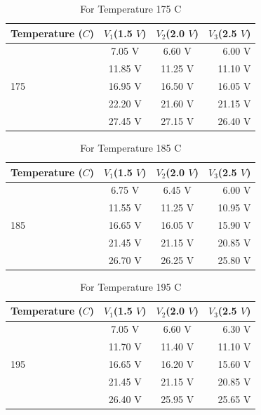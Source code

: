 \documentclass[aps,twocolumn,secnumarabic,nobalancelastpage,amsmath,amssymb,
nofootinbib]{revtex4}
\begin{document}
\begin{center}
\begin{table}[htbp]
\begin{tabular}{|l|c|c|r|}
\hline
{\small Temperature ($C$)} & {\small $V_1$(1.5 $V$)} & {\small $V_2$(2.0 $V$)} & {\small $V_3$(2.5 $V$)} \\
\hline
		& 7.05 V 		& 6.60 V& 	6.00 V \\
 		& 11.85 V		& 11.25 V & 11.10 V \\
175 	& 16.95 V 		& 16.50 V & 16.05 V \\
		& 22.20 V 		& 21.60 V & 21.15 V \\
 		& 27.45 V 		& 27.15 V & 26.40 V \\

\hline
\end{tabular}
\caption{\label{tab:linfitresults} For Temperature  175 C}
\end{table}
\end{center}

\begin{center}
\begin{table}[htbp]
\begin{tabular}{|l|c|c|r|}
\hline
{\small Temperature ($C$)} & {\small $V_1$(1.5 $V$)} & {\small $V_2$(2.0 $V$)} & {\small $V_3$(2.5 $V$)} \\
\hline
		& 6.75 V 		& 6.45 V& 	6.00 V \\
 		& 11.55 V		& 11.25 V & 10.95 V \\
185 	& 16.65 V 		& 16.05 V & 15.90 V \\
 		& 21.45 V 		& 21.15 V & 20.85 V \\
 		& 26.70 V 		& 26.25 V & 25.80 V \\

\hline
\end{tabular}
\caption{\label{tab:linfitresults} For Temperature 185 C }
\end{table}
\end{center}

\begin{center}
\begin{table}[htbp]
\begin{tabular}{|l|c|c|r|}
\hline
{\small Temperature ($C$)} & {\small $V_1$(1.5 $V$)} & {\small $V_2$(2.0 $V$)} & {\small $V_3$(2.5 $V$)} \\
\hline
		& 7.05 V 		& 6.60 V& 	6.30 V \\
 		& 11.70 V		& 11.40 V & 11.10 V \\
195 	& 16.65 V 		& 16.20 V & 15.60 V \\
 		& 21.45 V 		& 21.15 V & 20.85 V \\
 		& 26.40 V 		& 25.95 V & 25.65 V \\

\hline
\end{tabular}
\caption{\label{tab:linfitresults} For Temperature  195 C}
\end{table}
\end{center}
\end{document}
